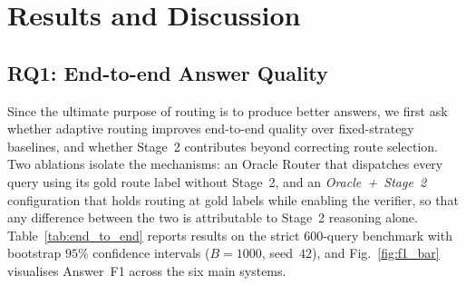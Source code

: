 \section{Results and Discussion}\label{sec:results}

\subsection{RQ1: End-to-end Answer Quality}\label{subsec:rq1}

Since the ultimate purpose of routing is to produce better answers, we first
ask whether adaptive routing improves end-to-end quality over fixed-strategy
baselines, and whether Stage~2 contributes beyond correcting route selection.
Two ablations isolate the mechanisms: an Oracle Router that dispatches every
query using its gold route label without Stage~2, and an
\textit{Oracle~+~Stage~2} configuration that holds routing at gold labels
while enabling the verifier, so that any difference between the two is
attributable to Stage~2 reasoning alone. Table~\ref{tab:end_to_end} reports
results on the strict $600$-query benchmark with bootstrap $95\%$ confidence
intervals ($B=1000$, seed~$42$), and Fig.~\ref{fig:f1_bar} visualises
Answer~F1 across the six main systems.

